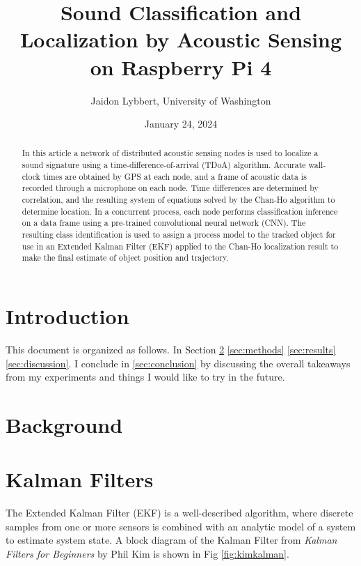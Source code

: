 \documentclass[12pt]{article}
\begin{document}
\title{Sound Classification and Localization by Acoustic Sensing on Raspberry Pi 4}
\author{Jaidon Lybbert, University of Washington}
\date{January 24, 2024}

\maketitle

\begin{abstract}
	In this article a network of distributed acoustic sensing nodes is used to localize a sound signature using a time-difference-of-arrival (TDoA) algorithm. Accurate wall-clock times are obtained by GPS at each node, and a frame of acoustic data is recorded through a microphone on each node. Time differences are determined by correlation, and the resulting system of equations solved by the Chan-Ho algorithm to determine location. In a concurrent process, each node performs classification inference on a data frame using a pre-trained convolutional neural network (CNN). The resulting class identification is used to assign a process model to the tracked object for use in an Extended Kalman Filter (EKF) applied to the Chan-Ho localization result to make the final estimate of object position and trajectory.
\end{abstract}

\section{Introduction}
This document is organized as follows. In Section \ref{sec:background} \ref{sec:methods} \ref{sec:results} \ref{sec:discussion}. I conclude in \ref{sec:conclusion} by discussing the overall takeaways from my experiments and things I would like to try in the future.

\section{Background}\label{sec:background}



\section{Kalman Filters}

	The Extended Kalman Filter (EKF) is a well-described algorithm, where discrete samples from one or more sensors is combined with an analytic model of a system to estimate system state. A block diagram of the Kalman Filter from \textit{Kalman Filters for Beginners} by Phil Kim \cite{kim2011kalman} is shown in Fig \ref{fig:kimkalman}.
	
\end{document}
